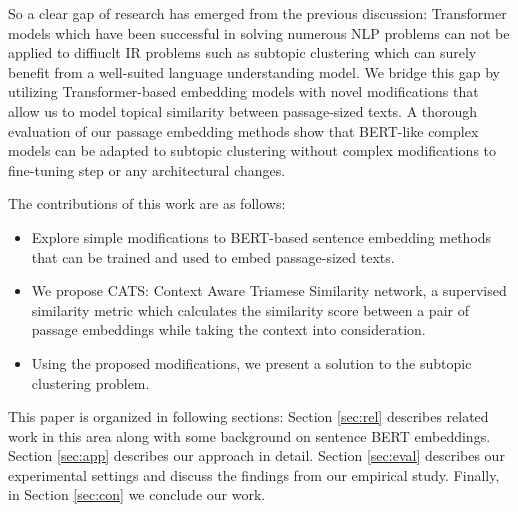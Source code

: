 So a clear gap of research has emerged from the previous discussion: Transformer models which have been successful in solving numerous NLP problems can not be applied to diffiuclt IR problems such as subtopic clustering which can surely benefit from a well-suited language understanding model. We bridge this gap by utilizing Transformer-based embedding models with novel modifications that allow us to model topical similarity between passage-sized texts. A thorough evaluation of our passage embedding methods show that BERT-like complex models can be adapted to subtopic clustering without complex modifications to fine-tuning step or any architectural changes.

The contributions of this work are as follows:

\begin{itemize}[leftmargin=.15in]
    \item Explore simple modifications to BERT-based sentence embedding methods that can be trained and used to embed passage-sized texts.
    \item We propose CATS: Context Aware Triamese Similarity network, a supervised similarity metric which calculates the similarity score between a pair of passage embeddings while taking the context into consideration.
    \item Using the proposed modifications, we present a solution to the subtopic clustering problem.
\end{itemize}

This paper is organized in following sections: Section \ref{sec:rel} describes related work in this area along with some background on sentence BERT embeddings. Section \ref{sec:app} describes our approach in detail. Section \ref{sec:eval} describes our experimental settings and discuss the findings from our empirical study. Finally, in Section \ref{sec:con} we conclude our work.

